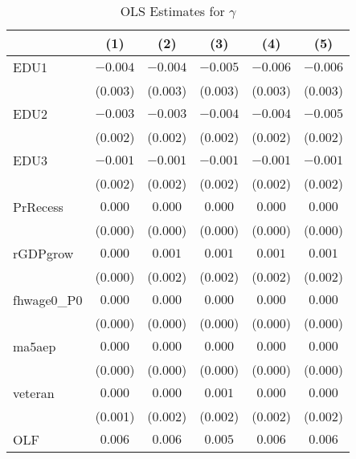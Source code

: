 \documentclass[12pt]{article}
\begin{document}
\begin{table}[ht]
\centering
\caption{OLS Estimates for $\gamma$}



\begin{tabular}{lccccc}


\toprule
                    & (1)     & (2)   & (3)    & (4)      & (5)         \\
\midrule
EDU1                & $-0.004$  & $-0.004$    & $-0.005$  & $-0.006$   & $-0.006$    \\
                    & (0.003)   & (0.003)     & (0.003)   & (0.003)    & (0.003)     \\
EDU2                & $-0.003$  & $-0.003$    & $-0.004$  & $-0.004$   & $-0.005$    \\
                    & (0.002)   & (0.002)     & (0.002)   & (0.002)    & (0.002)     \\
EDU3                & $-0.001$  & $-0.001$    & $-0.001$  & $-0.001$   & $-0.001$    \\
                    & (0.002)   & (0.002)     & (0.002)   & (0.002)    & (0.002)     \\
PrRecess            & $0.000$   & $0.000$     & $0.000$   & $0.000$    & $0.000$     \\
                    & (0.000)   & (0.000)     & (0.000)   & (0.000)    & (0.000)     \\
rGDPgrow            & $0.000$   & $0.001$     & $0.001$   & $0.001$    & $0.001$     \\
                    & (0.000)   & (0.002)     & (0.002)   & (0.002)    & (0.002)     \\
fhwage0\_P0         & $0.000$   & $0.000$     & $0.000$   & $0.000$    & $0.000$     \\
                    & (0.000)   & (0.000)     & (0.000)   & (0.000)    & (0.000)     \\
ma5aep              & $0.000$   & $0.000$     & $0.000$   & $0.000$    & $0.000$     \\
                    & (0.000)   & (0.000)     & (0.000)   & (0.000)    & (0.000)     \\
veteran             & $0.000$   & $0.000$     & $0.001$   & $0.000$    & $0.000$     \\
                    & (0.001)   & (0.002)     & (0.002)   & (0.002)    & (0.002)     \\
OLF                 & $0.006$   & $0.006$     & $0.005$   & $0.006$    & $0.006$     \\

\end{tabular}
\end{table}
\end{document}
